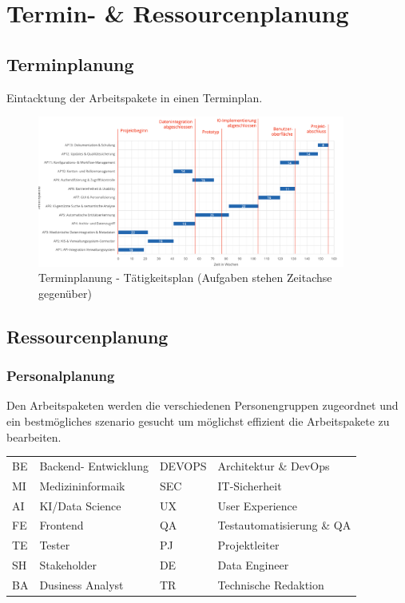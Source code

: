 {\let\clearpage\relax
\chapter{Termin- \& Ressourcenplanung}}
\label{sec:terminplanung}

\section{Terminplanung}
Eintacktung der Arbeitspakete in einen Terminplan.
\begin{figure}
	\centering
	\includegraphics[width=0.9\textwidth]{fig/Terminplanung.png}
	\caption{Terminplanung - Tätigkeitsplan (Aufgaben stehen Zeitachse gegenüber)}
	\label{fig:terminplanung}
\end{figure}

\section{Ressourcenplanung}
\subsection{Personalplanung}
Den Arbeitspaketen werden die verschiedenen Personengruppen zugeordnet und ein bestmögliches szenario gesucht um möglichst effizient die Arbeitspakete zu bearbeiten.
\begin{center}
\begin{tabular}{p{2cm} p{4cm}|p{2cm} p{5cm}}
	BE & Backend- Entwicklung & DEVOPS & Architektur \& DevOps \\
	MI & Medizininformaik & SEC & IT-Sicherheit \\
	AI & KI/Data Science & UX & User Experience \\
	FE & Frontend & QA & Testautomatisierung \& QA \\
	TE & Tester & PJ & Projektleiter \\
	SH & Stakeholder & DE & Data Engineer \\
	BA & Dusiness Analyst & TR & Technische Redaktion
\end{tabular}
\end{center}

